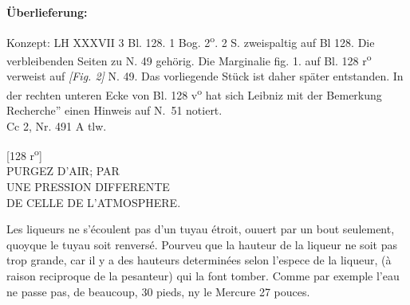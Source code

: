       
               
                \begin{ledgroupsized}[r]{120mm}
                \footnotesize 
                \pstart                
                \noindent\textbf{\"{U}berlieferung:}   
                \pend
                \end{ledgroupsized}
            
              
                            \begin{ledgroupsized}[r]{114mm}
                            \footnotesize 
                            \pstart \parindent -6mm
                            Konzept: LH XXXVII 3 Bl. 128. 1 Bog. 2\textsuperscript{o}. 2 S. zweispaltig auf Bl 128. Die verbleibenden Seiten zu N. 49\raisebox{-0.5ex}{\notsotiny 4} geh\"{o}rig. Die Marginalie fig. 1. auf Bl. 128 r\textsuperscript{o} verweist auf \textit{[Fig. 2]} N. 49\raisebox{-0.5ex}{\notsotiny 3}. Das vorliegende St\"{u}ck ist daher sp\"{a}ter entstanden. In der rechten unteren Ecke von Bl. 128 v\textsuperscript{o} hat sich Leibniz mit der Bemerkung \glqq Recherche'' einen Hinweis auf N.~51 notiert.\\Cc 2, Nr. 491 A tlw. \pend
                            \end{ledgroupsized}
                \vspace*{8mm}
                \pstart 
                \normalsize
           \begin{center}[128 r\textsuperscript{o}] \\PURGEZ D'AIR;   PAR\\UNE PRESSION DIFFERENTE\\DE CELLE DE L'ATMOSPHERE.\rule[-4mm]{0mm}{4mm}\end{center}
            Les liqueurs\protect{} ne s'\'{e}coulent pas d'un tuyau \'{e}troit, ouuert par un bout seulement, quoyque le tuyau soit renvers\'{e}.\pend \pstart {} Pourveu que la hauteur de la liqueur\protect{} ne soit pas trop grande, car il y a des hauteurs determin\'{e}es selon l'espece de la liqueur\protect{}, (\`{a} raison reciproque de la pesanteur) qui la font tomber. Comme par exemple l'eau ne passe pas, de beaucoup, 30 pieds, ny le Mercure\protect{} 27 pouces. %
